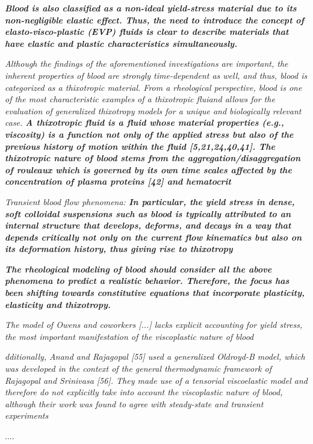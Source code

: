 \documentclass[11pt,letterpaper]{article}
\begin{document}
{\color{red}
\textit{\textbf{Blood is also classified as a non-ideal yield-stress material due to its non-negligible elastic effect. Thus, the need to introduce the concept of elasto-visco-plastic (EVP) fluids is clear to describe materials that have elastic and plastic characteristics simultaneously.}}}

\textit{Although the findings of the aforementioned investigations are important, the inherent properties
of blood are strongly time-dependent as well, and thus, blood is categorized as a thixotropic material. From a rheological perspective, blood is one of the most characteristic examples of a thixotropic fluiand allows for the evaluation of generalized thixotropy models for a unique and biologically relevant case. \textbf{A thixotropic fluid is a fluid whose material properties (e.g., viscosity) is a function not only of the applied stress but also of the previous history of motion within the fluid [5,21,24,40,41]. The thixotropic nature of blood stems from the aggregation/disaggregation of rouleaux which is governed by its own time scales affected by the concentration of plasma proteins [42] and hematocrit} }

\textit{Transient blood flow phenomena: 
\textbf{In particular, the yield stress in dense, soft colloidal suspensions such as blood is typically attributed to an internal structure that develops, deforms, and decays in a way that depends critically not only on the current flow kinematics but also on its deformation history, thus giving rise to thixotropy}}


{\color{red}
\textit{\textbf{The rheological modeling of blood should consider all the above phenomena to predict a realistic
behavior. Therefore, the focus has been shifting towards constitutive equations that incorporate plasticity, elasticity and thixotropy.}}}

\textit{The model of Owens and coworkers [...] lacks explicit accounting for yield stress, the most important manifestation of the viscoplastic nature of blood}

\textit{dditionally, Anand and Rajagopal [55] used a generalized Oldroyd-B model, which was developed in the context of the general thermodynamic framework of Rajagopal and Srinivasa [56]. They made use of a tensorial viscoelastic model and therefore do not explicitly take into account the viscoplastic nature of blood, although their work was found to agree with steady-state and transient experiments}


....
\end{document}
